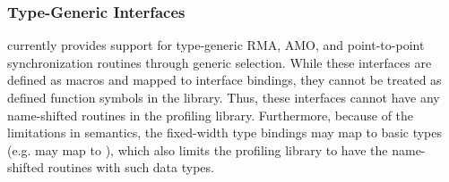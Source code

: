 \subsubsection{\Cstd[11] Type-Generic Interfaces}
\label{sec:pshmem_c11_type_generic_interfaces}
\openshmem currently provides support for type-generic RMA, AMO, 
and point-to-point synchronization routines through \Cstd[11] 
generic selection. While these interfaces are defined as macros 
and mapped to \Cstd interface bindings, they cannot be treated as 
defined function symbols in the library. Thus, these interfaces 
cannot have any name-shifted  routines in 
the profiling library. Furthermore, because of the limitations in 
\Cstd {} semantics, the \Cstd[11] fixed-width type 
bindings may map to \Cstd basic types (e.g.  may map 
to ), which also limits the profiling library to 
have the name-shifted routines with such data types. 
